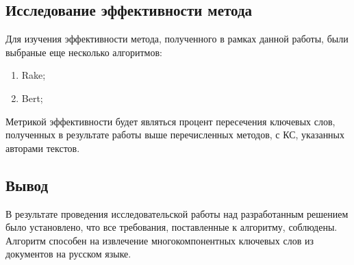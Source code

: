 \subsection{Исследование эффективности метода}
Для изучения эффективности метода, полученного в рамках данной работы, были выбраные еще несколько алгоритмов:
\begin{enumerate}
	\item Rake;
	\item Bert;
\end{enumerate}
Метрикой эффективности будет являться процент пересечения ключевых слов, полученных в результате работы выше перечисленных методов, с КС, указанных авторами текстов.



\subsection{Вывод}
В результате проведения исследовательской работы над разработанным решением было установлено, что все требования, поставленные к алгоритму, соблюдены.
Алгоритм способен на извлечение многокомпонентных ключевых слов из документов на русском языке.
